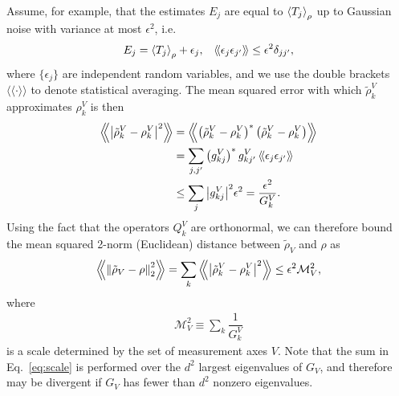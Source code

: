 \documentclass[notitlepage,twocolumn]{revtex4-2}
\newcommand{\f}[2]{\dfrac{#1}{#2}} %
\newcommand{\p}[1]{\left(#1\right)} %
\renewcommand{\set}[1]{\{#1\}} %
\newcommand{\bk}{\Braket} %
\newcommand{\bbk}[1]{\langle\!\langle #1 \rangle\!\rangle}
\newcommand{\Bbk}[1]
{\left\langle\!\!\left\langle #1 \right\rangle\!\!\right\rangle}
\newcommand{\1}{\mathds{1}}
\newcommand{\M}{\mathcal{M}}
\begin{document}
Assume, for example, that the estimates $E_j$ are equal to $\bk{T_j}_\rho$ up to Gaussian noise with variance at most $\epsilon^2$, i.e.
\begin{align}
  E_j = \bk{T_j}_\rho + \epsilon_j,
  &&
  \bbk{\epsilon_j \epsilon_{j'}} \le \epsilon^2 \delta_{jj'},
\end{align}
where $\set{\epsilon_j}$ are independent random variables, and we use the double brackets $\bbk{\cdot}$ to denote statistical averaging.
The mean squared error with which $\tilde\rho^V_k$ approximates $\rho^V_k$ is then
\begin{align}
  \Bbk{\abs{\tilde\rho^V_k-\rho^V_k}^2}
  &= \Bbk{\p{\tilde\rho^V_k-\rho^V_k}^*\p{\tilde\rho^V_k-\rho^V_k}} \\
  &= \sum_{j,j'} \p{g^V_{kj}}^* g^V_{kj'}\,
  \bbk{\epsilon_j \epsilon_{j'}} \\
  &\le \sum_j \abs{g^V_{kj}}^2 \epsilon^2
  = \f{\epsilon^2}{G^V_k}.
\end{align}
Using the fact that the operators $Q^V_k$ are orthonormal, we can therefore bound the mean squared 2-norm (Euclidean) distance between $\tilde\rho_V$ and $\rho$ as
\begin{align}
  \Bbk{\norm{\tilde\rho_V-\rho}_2^2}
  = \sum_k \Bbk{\abs{\tilde\rho^V_k - \rho^V_k}^2}
  \le \epsilon^2 \M_V^2,
  \label{eq:bound}
\end{align}
where
\begin{align}
  \M_V^2 \equiv \sum_k \f1{G^V_k}
  \label{eq:scale}
\end{align}
is a scale determined by the set of measurement axes $V$.
Note that the sum in Eq.~\eqref{eq:scale} is performed over the $d^2$ largest eigenvalues of $G_V$, and therefore may be divergent if $G_V$ has fewer than $d^2$ nonzero eigenvalues.
\end{document}
